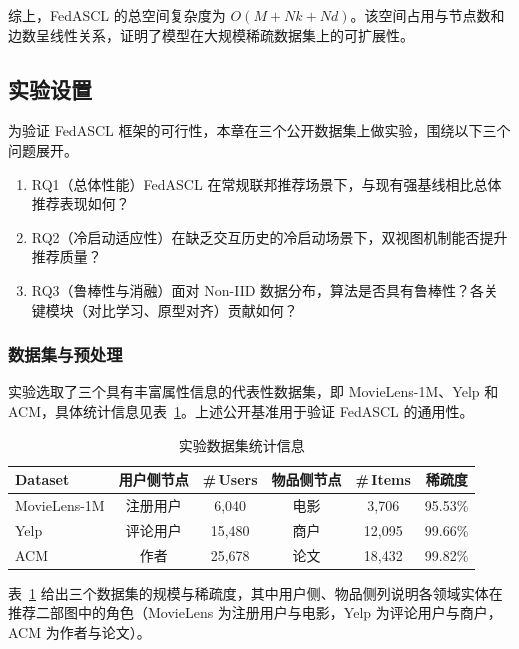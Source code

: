 综上，FedASCL 的总空间复杂度为 $O(M + Nk + Nd)$。该空间占用与节点数和边数呈线性关系，证明了模型在大规模稀疏数据集上的可扩展性。

\subsection{实验设置}
\label{subsec:exp_setup}

为验证 FedASCL 框架的可行性，本章在三个公开数据集上做实验，围绕以下三个问题展开。
\begin{enumerate}[label=\arabic*., labelsep=0.08em, leftmargin=2.1em, labelwidth=1.65em, align=left, noitemsep, topsep=2pt, parsep=0pt]
    \item RQ1（总体性能）FedASCL 在常规联邦推荐场景下，与现有强基线相比总体推荐表现如何？
    \item RQ2（冷启动适应性）在缺乏交互历史的冷启动场景下，双视图机制能否提升推荐质量？
    \item RQ3（鲁棒性与消融）面对 Non-IID 数据分布，算法是否具有鲁棒性？各关键模块（对比学习、原型对齐）贡献如何？
\end{enumerate}

\subsubsection{数据集与预处理}
实验选取了三个具有丰富属性信息的代表性数据集，即 MovieLens-1M、Yelp 和 ACM，具体统计信息见表~\ref{tab:dataset_stat}。上述公开基准用于验证 FedASCL 的通用性。

\begin{table}[H]
    \centering
    \caption{实验数据集统计信息}
    \label{tab:dataset_stat}
    \begin{tabular}{lccccc}
        \toprule
        Dataset & 用户侧节点 & \#\,Users & 物品侧节点 & \#\,Items & 稀疏度 \\
        \midrule
        MovieLens-1M & 注册用户 & 6,040 & 电影 & 3,706 & 95.53\% \\
        Yelp & 评论用户 & 15,480 & 商户 & 12,095 & 99.66\% \\
        ACM & 作者 & 25,678 & 论文 & 18,432 & 99.82\% \\
        \bottomrule
    \end{tabular}
\end{table}

表~\ref{tab:dataset_stat} 给出三个数据集的规模与稀疏度，其中用户侧、物品侧列说明各领域实体在推荐二部图中的角色（MovieLens 为注册用户与电影，Yelp 为评论用户与商户，ACM 为作者与论文）。

